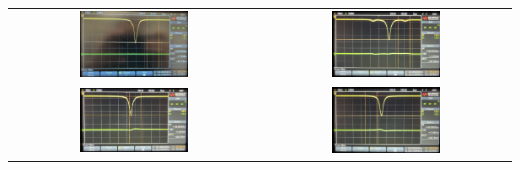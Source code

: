 \begin{center}
    \captionsetup{type=figure}
    \begin{tabular}{c c}
        \includegraphics[width=0.45\textwidth]{Bilder/Modulationsindex/mindex_0.jpg} 
        & \includegraphics[width=0.45\textwidth]{Bilder/Modulationsindex/mindex_50.jpg}   \\
        \includegraphics[width=0.45\textwidth]{Bilder/Modulationsindex/mindex_200.jpg} 
        & \includegraphics[width=0.45\textwidth]{Bilder/Modulationsindex/mindex_400.jpg}  \\
    \end{tabular}
    \label{fig:mindex1}
\end{center}

